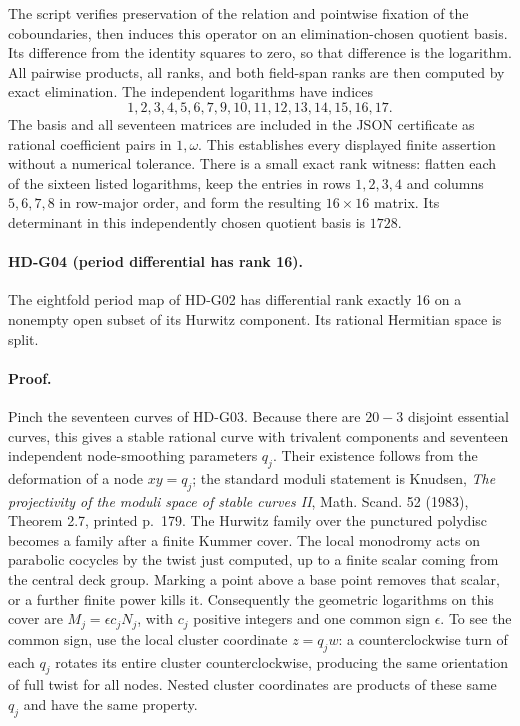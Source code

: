 The script verifies preservation of the relation and pointwise fixation
of the coboundaries, then induces this operator on an elimination-chosen
quotient basis. Its difference from the identity squares to zero,
so that difference is the logarithm. All pairwise products, all ranks,
and both field-span ranks are then computed by exact elimination.
The independent logarithms have indices
\[
1,2,3,4,5,6,7,9,10,11,12,13,14,15,16,17.
\]
The basis and all seventeen matrices are included in the JSON certificate
as rational coefficient pairs in $1,\omega$. This establishes every
displayed finite assertion without a numerical tolerance.
There is a small exact rank witness: flatten each of the sixteen listed
logarithms, keep the entries in rows $1,2,3,4$ and columns $5,6,7,8$
in row-major order, and form the resulting $16\times16$ matrix.
Its determinant in this independently chosen quotient basis is $1728$.

\paragraph{HD-G04 (period differential has rank 16).}
The eightfold period map of HD-G02 has differential rank exactly 16 on
a nonempty open subset of its Hurwitz component. Its rational Hermitian
space is split.

\paragraph{Proof.}
Pinch the seventeen curves of HD-G03. Because there are $20-3$ disjoint
essential curves, this gives a stable rational curve with trivalent
components and seventeen independent node-smoothing parameters $q_j$.
Their existence follows from the deformation of a node $xy=q_j$;
the standard moduli statement is Knudsen, \emph{The projectivity of the
moduli space of stable curves II}, Math. Scand. 52 (1983), Theorem 2.7,
printed p.~179.
The Hurwitz family over the punctured polydisc becomes a family after
a finite Kummer cover. The local monodromy acts on parabolic cocycles
by the twist just computed, up to a finite scalar coming from the
central deck group. Marking a point above a base point removes that
scalar, or a further finite power kills it. Consequently the geometric
logarithms on this cover are $M_j=\epsilon c_jN_j$, with $c_j$ positive
integers and one common sign $\epsilon$. To see the common sign,
use the local cluster coordinate $z=q_jw$: a counterclockwise turn
of each $q_j$ rotates its entire cluster counterclockwise, producing
the same orientation of full twist for all nodes. Nested cluster
coordinates are products of these same $q_j$ and have the same property.

